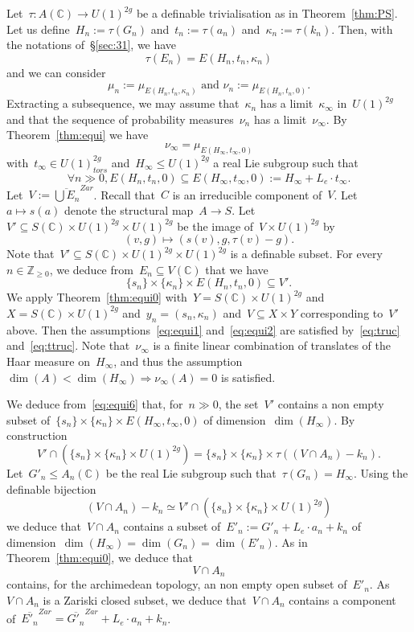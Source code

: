 \documentclass[12pt]{amsart}
\newcommand{\Z}{{\mathbb Z}}
\newcommand{\C}{{\mathbb C}}
\newcommand{\ol}{\overline}
\begin{document}
Let~$\tau:A(\C) \to U(1)^{2g}$ be a definable trivialisation as in Theorem~\ref{thm:PS}. Let us define~$H_n:=\tau(G_n)$ and~$t_n:=\tau(a_n)$ and~$\kappa_n:=\tau(k_n)$. Then, with the notations of~\S\ref{sec:31}, we have
\[
\tau(E_n)=E(H_n,t_n,\kappa_n)
\]
and we can consider
\[
\mu_n:=\mu_{E(H_n,t_n,\kappa_n)}\text{ and }
\nu_n:=\mu_{E(H_n,t_n,0)}.
\]
Extracting a subsequence, we may assume that~$\kappa_n$ has a limit~$\kappa_{\infty}$ in~$U(1)^{2g}$ 
and that the sequence of probability measures~$\nu_n$ has a limit~$\nu_{\infty}$. By Theorem~\ref{thm:equi}
we have
\[
\nu_\infty=\mu_{E(H_\infty,t_\infty,0)}
\]
with~$t_\infty\in U(1)_{tors}^{2g}$ and~$H_\infty\leq U(1)^{2g}$ a real Lie subgroup such that
\begin{equation}\label{eq:truc}
\forall n\gg0, 
E(H_n,t_n,0)\subseteq E(H_\infty,t_\infty,0):= H_\infty +L_e\cdot t_{\infty}.
\end{equation}
Let~$V:=\ol{\bigcup E_n}^{Zar}$. Recall that~$C$ is an irreducible component of~$V$. Let~$a\mapsto s(a)$ denote the structural map~$A\to S$. Let~$V'\subseteq S(\C)\times U(1)^{2g}\times U(1)^{2g}$
be the image of~$V\times U(1)^{2g}$ by
\[
(v,g)\mapsto (s(v),g, \tau(v)-g).
\]
Note that~$V'\subseteq S(\C)\times U(1)^{2g}\times U(1)^{2g}$ is a definable subset. For every~$n\in\Z_{\geq0}$, we deduce from~$E_n\subseteq V(\C)$ that
we have
\begin{equation}\label{eq:ttruc}
\{s_n\}\times \{\kappa_n\}\times E(H_n,t_n,0)\subseteq V'.
\end{equation}
We apply Theorem~\ref{thm:equi0} with~$Y=S(\C)\times U(1)^{2g}$ and~$X=S(\C)\times U(1)^{2g}$ and~$y_n=(s_n,\kappa_n)$ and~$V\subseteq X\times Y$ corresponding to~$V'$ above. Then the assumptions~\eqref{eq:equi1} and~\eqref{eq:equi2} are satisfied by~\eqref{eq:truc} and~\eqref{eq:ttruc}. Note that~$\nu_\infty$ is a finite linear combination of translates of the Haar measure on~$H_\infty$, and thus the assumption~$\dim(A)<\dim(H_\infty)\Rightarrow \nu_\infty(A)=0$ is satisfied.
 
We deduce from~\eqref{eq:equi6} that, for~$n\gg0$, the set~$V'$ contains a non empty subset of~$\{s_n\}\times \{\kappa_n\}\times E(H_\infty,t_\infty,0)$ of dimension~$\dim(H_\infty)$. By construction
\[
V'\cap \left( \{s_n\}\times \{\kappa_n\}\times U(1)^{2g}\right)=\{s_n\}\times \{\kappa_n\}\times \tau((V\cap A_n)-k_n).
\]
Let~$G'_n\leq A_n(\C)$ be the real Lie subgroup such that~$\tau(G_n)=H_\infty$. 
Using the definable bijection
\[
(V\cap A_n)-k_n\simeq V'\cap \left(\{s_n\}\times \{\kappa_n\}\times U(1)^{2g}\right)
\] 
we deduce that~$V\cap A_n$ contains a subset of~$E'_n:=G'_n+L_e\cdot a_n+k_n$ of dimension~$\dim(H_\infty)=\dim(G_n)=\dim(E'_n)$. As in Theorem~\ref{thm:equi0}, we deduce that
\[
V\cap A_n
\]
contains, for the archimedean topology, an non empty open subset of~$E'_n$. As~$V\cap A_n$ is a Zariski closed subset,
we deduce that~$V\cap A_n$ contains a component of~$\ol{E'_n}^{Zar}=\ol{G'_n}^{Zar}+L_e\cdot a_n+k_n$.
\end{document}
